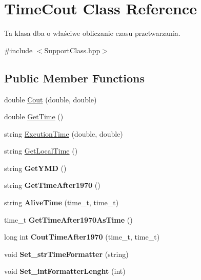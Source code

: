 \hypertarget{classTimeCout}{
\section{TimeCout Class Reference}
\label{classTimeCout}
}


Ta klasa dba o właściwe obliczanie czasu przetwarzania.  




{\ttfamily \#include $<$SupportClass.hpp$>$}

\subsection*{Public Member Functions}
\begin{DoxyCompactItemize}
\item 
double \hyperlink{classTimeCout_ac8c0cffeea3afdc63d2d9cb86320c89f}{Cout} (double, double)
\item 
double \hyperlink{classTimeCout_ad88edc4a3eccda520f2bdf7d69f852b9}{GetTime} ()
\item 
string \hyperlink{classTimeCout_a6ed7a20e4510642d6ffdf1cdbffd2b9f}{ExcutionTime} (double, double)
\item 
string \hyperlink{classTimeCout_a343b4ea828779afff35c01bbfc4fa506}{GetLocalTime} ()
\item 
\hypertarget{classTimeCout_a9086322580eec557a48841f43ad83a65}{
string {\bfseries GetYMD} ()}
\label{classTimeCout_a9086322580eec557a48841f43ad83a65}

\item 
\hypertarget{classTimeCout_a9c09ef549f3f5a26c1f4555f887f1dcc}{
string {\bfseries GetTimeAfter1970} ()}
\label{classTimeCout_a9c09ef549f3f5a26c1f4555f887f1dcc}

\item 
\hypertarget{classTimeCout_a15170e990cfc32d0a59ca768119d9b19}{
string {\bfseries AliveTime} (time\_\-t, time\_\-t)}
\label{classTimeCout_a15170e990cfc32d0a59ca768119d9b19}

\item 
\hypertarget{classTimeCout_a6fd1f7b09ccd8472adb0e350a0d4d466}{
time\_\-t {\bfseries GetTimeAfter1970AsTime} ()}
\label{classTimeCout_a6fd1f7b09ccd8472adb0e350a0d4d466}

\item 
\hypertarget{classTimeCout_a5a1188c0b81f212922a82c8fb3765180}{
long int {\bfseries CoutTimeAfter1970} (time\_\-t, time\_\-t)}
\label{classTimeCout_a5a1188c0b81f212922a82c8fb3765180}

\item 
\hypertarget{classTimeCout_a774d3e20476e97321cb07b83d50eb57e}{
void {\bfseries Set\_\-strTimeFormatter} (string)}
\label{classTimeCout_a774d3e20476e97321cb07b83d50eb57e}

\item 
\hypertarget{classTimeCout_ad0a132c052a5ccfc49ce155c85fd71e0}{
void {\bfseries Set\_\-intFormatterLenght} (int)}
\label{classTimeCout_ad0a132c052a5ccfc49ce155c85fd71e0}

\end{DoxyCompactItemize}


